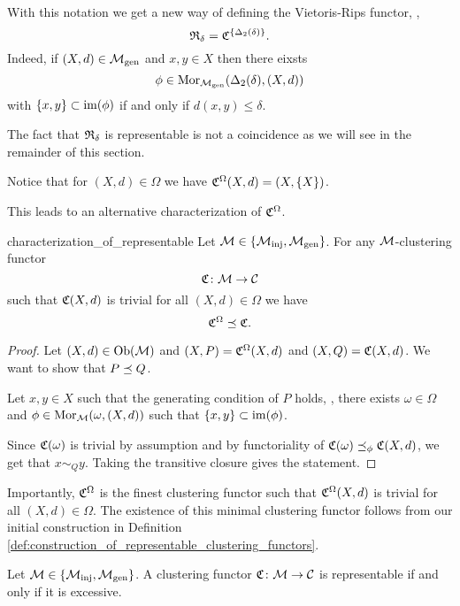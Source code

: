\begin{example}{}{}
With this notation we get a new way of defining the Vietoris-Rips functor, \ie,
$$
\mathfrak{R}_\delta = \mathfrak{C}^{\{\Delta_2(\delta)\}}.
$$
Indeed, if $(X,d) \in {\mathcal{M}_\mathrm{gen}}$ and $x,y \in X$ then there eixsts
$$
\phi \in \mathrm {Mor}_{\mathcal{M}_\mathrm{gen}}(\Delta_2(\delta), (X,d))
$$
with $\{x,y\} \subset \operatorname*{im}(\phi)$ if and only if $d(x,y) \leq \delta$.
\end{example}
The fact that $\mathfrak{R}_\delta$ is representable is not a coincidence as we will see in the remainder of this section.
\begin{myremark}{\cite[Rem.~6.3]{Carlsson2010}}{}
Notice that for $(X,d) \in \Omega$ we have $\mathfrak{C}^\Omega(X,d) = (X, \{X\})$.
\end{myremark}

This leads to an alternative characterization of $\mathfrak{C}^\Omega$.

\begin{proposition}{}{characterization_of_representable}
Let $\mathcal{M} \in \{{\mathcal{M}_\mathrm{inj}}, {\mathcal{M}_\mathrm{gen}}\}$. For any $\mathcal{M}$-clustering functor
$$
\mathfrak{C}\colon \mathcal{M} \to \mathcal{C}
$$
such that $\mathfrak{C}(X,d)$ is trivial for all $(X,d) \in \Omega$ we have
$$
\mathfrak{C}^\Omega \preceq \mathfrak{C}.
$$
\end{proposition}

\begin{proof}
Let $(X,d) \in \mathrm {Ob}(\mathcal{M})$ and $(X,P) = \mathfrak{C}^\Omega(X,d)$ and $(X,Q) = \mathfrak{C}(X,d)$. We want to show that $P \preceq Q$.

Let $x,y \in X$ such that the generating condition of $P$ holds, \ie, there exists $\omega \in \Omega$ and $\phi \in \mathrm {Mor}_{\mathcal{M}}(\omega, (X,d))$ such that $\{x,y\} \subset \operatorname*{im}(\phi)$.

Since $\mathfrak{C}(\omega)$ is trivial by assumption and by functoriality of $\mathfrak{C}(\omega) \preceq_\phi \mathfrak{C}(X,d)$, we get that $x \sim_Q y$. Taking the transitive closure gives the statement.
\end{proof}

Importantly, $\mathfrak{C}^\Omega$ is the finest clustering functor such that $\mathfrak{C}^\Omega(X,d)$ is trivial for all $(X,d) \in \Omega$. The existence of this minimal clustering functor follows from our initial construction in Definition \ref{def:construction_of_representable_clustering_functors}.

\begin{theorem}{\cite[Thm.~6.2]{Carlsson2010}}{}
Let $\mathcal{M} \in \{{\mathcal{M}_\mathrm{inj}}, {\mathcal{M}_\mathrm{gen}}\}$. A clustering functor $\mathfrak{C}\colon \mathcal{M} \to \mathcal{C}$ is representable if and only if it is excessive.
\end{theorem}

